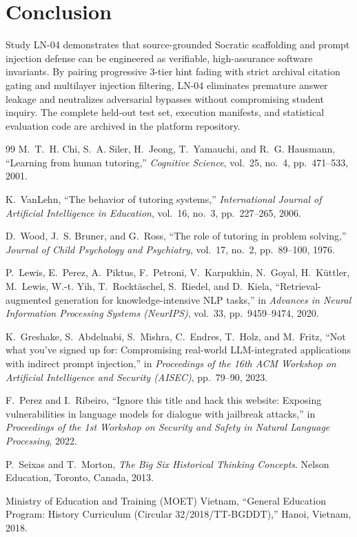 \documentclass[11pt,a4paper]{article}
\begin{document}
\section{Conclusion}
Study LN-04 demonstrates that source-grounded Socratic scaffolding and prompt injection defense can be engineered as verifiable, high-assurance software invariants. By pairing progressive 3-tier hint fading with strict archival citation gating and multilayer injection filtering, LN-04 eliminates premature answer leakage and neutralizes adversarial bypasses without compromising student inquiry. The complete held-out test set, execution manifests, and statistical evaluation code are archived in the platform repository.

\begin{thebibliography}{99}
M.~T.~H. Chi, S.~A. Siler, H.~Jeong, T.~Yamauchi, and R.~G. Hausmann, ``Learning from human tutoring,'' \emph{Cognitive Science}, vol.~25, no.~4, pp.~471--533, 2001.

K.~VanLehn, ``The behavior of tutoring systems,'' \emph{International Journal of Artificial Intelligence in Education}, vol.~16, no.~3, pp.~227--265, 2006.

D.~Wood, J.~S. Bruner, and G.~Ross, ``The role of tutoring in problem solving,'' \emph{Journal of Child Psychology and Psychiatry}, vol.~17, no.~2, pp.~89--100, 1976.

P.~Lewis, E.~Perez, A.~Piktus, F.~Petroni, V.~Karpukhin, N.~Goyal, H.~K\"{u}ttler, M.~Lewis, W.-t. Yih, T.~Rockt\"{a}schel, S.~Riedel, and D.~Kiela, ``Retrieval-augmented generation for knowledge-intensive NLP tasks,'' in \emph{Advances in Neural Information Processing Systems (NeurIPS)}, vol.~33, pp.~9459--9474, 2020.

K.~Greshake, S.~Abdelnabi, S.~Mishra, C.~Endres, T.~Holz, and M.~Fritz, ``Not what you've signed up for: Compromising real-world LLM-integrated applications with indirect prompt injection,'' in \emph{Proceedings of the 16th ACM Workshop on Artificial Intelligence and Security (AISEC)}, pp.~79--90, 2023.

F.~Perez and I.~Ribeiro, ``Ignore this title and hack this website: Exposing vulnerabilities in language models for dialogue with jailbreak attacks,'' in \emph{Proceedings of the 1st Workshop on Security and Safety in Natural Language Processing}, 2022.

P.~Seixas and T.~Morton, \emph{The Big Six Historical Thinking Concepts}. Nelson Education, Toronto, Canada, 2013.

Ministry of Education and Training (MOET) Vietnam, ``General Education Program: History Curriculum (Circular 32/2018/TT-BGDDT),'' Hanoi, Vietnam, 2018.
\end{thebibliography}
\end{document}
